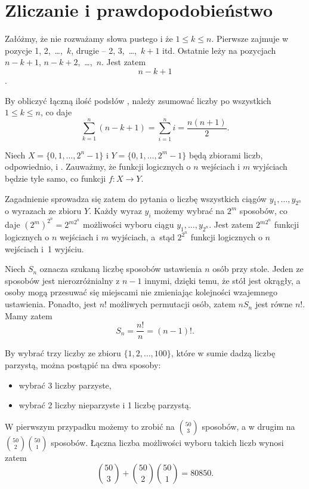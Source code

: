 \chapter{Zliczanie i prawdopodobieństwo}


\exercise{} %
Załóżmy, że nie rozważamy słowa pustego i że $1\le k\le n$. Pierwsze  zajmuje w~ pozycje 1, 2,~\dots,~$k$, drugie -- 2, 3,~\dots,~$k+1$ itd. Ostatnie  leży na pozycjach $n-k+1$, $n-k+2$,~\dots,~$n$. Jest zatem
\[
	n-k+1
\]
 .

By obliczyć łączną ilość podsłów , należy zsumować liczby  po wszystkich $1\le k\le n$, co daje
\[
	\sum_{k=1}^n(n-k+1) = \sum_{i=1}^ni = \frac{n(n+1)}{2}.
\]

\exercise{} %
Niech $X=\{0,1,\dots,2^n-1\}$ i $Y=\{0,1,\dots,2^m-1\}$ będą zbiorami liczb, odpowiednio,  i . Zauważmy, że funkcji logicznych o $n$ wejściach i $m$ wyjściach będzie tyle samo, co funkcji $f\colon X\to Y$.

Zagadnienie sprowadza się zatem do pytania o liczbę wszystkich ciągów $y_1,\dots,y_{2^n}$ o wyrazach ze zbioru  $Y$. Każdy wyraz $y_i$ możemy wybrać na $2^m$ sposobów, co daje $(2^m)^{2^n} = 2^{m2^n}$ możliwości wyboru ciągu $y_1,\dots,y_{2^n}$. Jest zatem $2^{m2^n}$ funkcji logicznych o $n$ wejściach i $m$ wyjściach, a~stąd $2^{2^n}$ funkcji logicznych o $n$ wejściach i~1 wyjściu.

\exercise{} %
Niech $S_n$ oznacza szukaną liczbę sposobów ustawienia $n$ osób przy stole. Jeden ze sposobów jest nierozróżnialny z $n-1$ innymi, dzięki temu, że stół jest okrągły, a osoby mogą przesuwać się miejscami nie zmieniając kolejności wzajemnego ustawienia. Ponadto, jest $n!$ możliwych permutacji osób, zatem $nS_n$ jest równe $n!$. Mamy zatem
\[
	S_n = \frac{n!}{n} = (n-1)!.
\]

\exercise{} %
By wybrać trzy liczby ze zbioru $\{1,2,\dots,100\}$, które w sumie dadzą liczbę parzystą, można postąpić na dwa sposoby:
\begin{itemize}
	\item wybrać 3 liczby parzyste,
	\item wybrać 2 liczby nieparzyste i 1 liczbę parzystą.
\end{itemize}
W pierwszym przypadku możemy to zrobić na $\binom{50}{3}$ sposobów, a w drugim na $\binom{50}{2}\binom{50}{1}$ sposobów. Łączna liczba możliwości wyboru takich liczb wynosi zatem
\[
	\binom{50}{3}+\binom{50}{2}\binom{50}{1} = 80850.
\]

